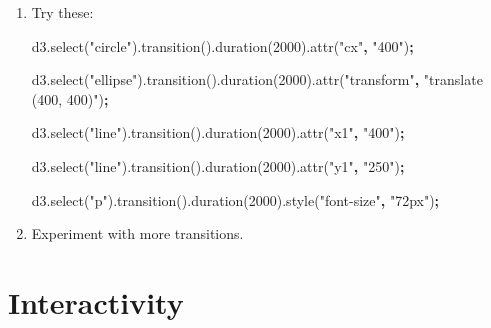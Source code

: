 \documentclass[openany]{book}
\newenvironment{Shaded}{\begin{snugshade}}{\end{snugshade}}
\newcommand{\AttributeTok}[1]{\textcolor[rgb]{0.77,0.63,0.00}{#1}}
\newcommand{\DecValTok}[1]{\textcolor[rgb]{0.00,0.00,0.81}{#1}}
\newcommand{\NormalTok}[1]{#1}
\newcommand{\OperatorTok}[1]{\textcolor[rgb]{0.81,0.36,0.00}{\textbf{#1}}}
\newcommand{\StringTok}[1]{\textcolor[rgb]{0.31,0.60,0.02}{#1}}
\newcommand{\VariableTok}[1]{\textcolor[rgb]{0.00,0.00,0.00}{#1}}
\begin{document}
\begin{enumerate}
\def\labelenumi{\arabic{enumi}.}
\item
  Try these:

\begin{Shaded}
\begin{Highlighting}[]
\VariableTok{d3}\NormalTok{.}\AttributeTok{select}\NormalTok{(}\StringTok{"circle"}\NormalTok{).}\AttributeTok{transition}\NormalTok{().}\AttributeTok{duration}\NormalTok{(}\DecValTok{2000}\NormalTok{).}\AttributeTok{attr}\NormalTok{(}\StringTok{"cx"}\OperatorTok{,} \StringTok{"400"}\NormalTok{)}\OperatorTok{;}

\VariableTok{d3}\NormalTok{.}\AttributeTok{select}\NormalTok{(}\StringTok{"ellipse"}\NormalTok{).}\AttributeTok{transition}\NormalTok{().}\AttributeTok{duration}\NormalTok{(}\DecValTok{2000}\NormalTok{).}\AttributeTok{attr}\NormalTok{(}\StringTok{"transform"}\OperatorTok{,} \StringTok{"translate (400, 400)"}\NormalTok{)}\OperatorTok{;}

\VariableTok{d3}\NormalTok{.}\AttributeTok{select}\NormalTok{(}\StringTok{"line"}\NormalTok{).}\AttributeTok{transition}\NormalTok{().}\AttributeTok{duration}\NormalTok{(}\DecValTok{2000}\NormalTok{).}\AttributeTok{attr}\NormalTok{(}\StringTok{"x1"}\OperatorTok{,} \StringTok{"400"}\NormalTok{)}\OperatorTok{;}

\VariableTok{d3}\NormalTok{.}\AttributeTok{select}\NormalTok{(}\StringTok{"line"}\NormalTok{).}\AttributeTok{transition}\NormalTok{().}\AttributeTok{duration}\NormalTok{(}\DecValTok{2000}\NormalTok{).}\AttributeTok{attr}\NormalTok{(}\StringTok{"y1"}\OperatorTok{,} \StringTok{"250"}\NormalTok{)}\OperatorTok{;}

\VariableTok{d3}\NormalTok{.}\AttributeTok{select}\NormalTok{(}\StringTok{"p"}\NormalTok{).}\AttributeTok{transition}\NormalTok{().}\AttributeTok{duration}\NormalTok{(}\DecValTok{2000}\NormalTok{).}\AttributeTok{style}\NormalTok{(}\StringTok{"font-size"}\OperatorTok{,} \StringTok{"72px"}\NormalTok{)}\OperatorTok{;}
\end{Highlighting}
\end{Shaded}
\item
  Experiment with more transitions.
\end{enumerate}

\hypertarget{interactivity}{%
\section{Interactivity }\label{interactivity}}
\end{document}
